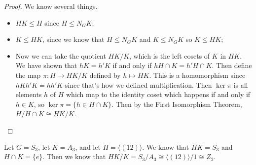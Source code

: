 \begin{proof}
We know several things.
\begin{itemize}
\item $HK \leq H$ since $H \leq N_G K$;
\item $K \leq HK$, since we know that $H \leq N_G K$ and $K \leq N_G K$ so $K \leq HK$;
\item Now we can take the quotient $HK/K$, which is the left cosets of $K$ in $HK$. We have shown that $hK = h'K$ if and only if $h H \cap K = h' H \cap K$. Then define the map $\pi : H \to HK/K$ defined by $h \mapsto HK$. This is a homomorphism since $hKh'K = hh'K$ since that's how we defined multiplication. Then $\ker\pi$ is all elements $h$ of $H$ which map to the identity coset which happens if and only if $h \in K$, so $\ker \pi = \{h \in H \cap K\}$. Then by the First Isomorphism Theorem, $H/H \cap K \cong HK/K$. \qedhere
\end{itemize}
\end{proof}

\begin{example}
Let $G = S_3$, let $K = A_3$, and let $H = \langle (12) \rangle$. We know that $HK = S_3$ and $H \cap K = \{e\}$. Then we know that $HK/K = S_3/A_3 \cong \langle (12) \rangle / 1 \cong Z_2$.
\end{example}